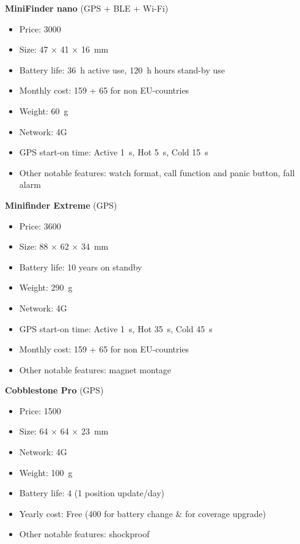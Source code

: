\textbf{MiniFinder nano} (\ac{GPS} + \ac{BLE} + Wi-Fi)
\begin{itemize}[label={}, noitemsep, leftmargin=0pt]
    \item Price: \SI{3000}{\dkk}
    \item Size: \si{47} × \si{41} × \SI{16}{\milli\meter}
    \item Battery life: \SI{36}{\hour} active use, \SI{120}{\hour} hours stand-by use
    \item Monthly cost: \SI{159}{\dkk} + \SI{65}{\dkk} for non EU-countries
    \item Weight: \SI{60}{\gram}
    \item Network: 4G
    \item \ac{GPS} start-on time: Active \SI{1}{\second}, Hot \SI{5}{\second}, Cold \SI{15}{\second}
    \item Other notable features: watch format, call function and panic button, fall alarm
\end{itemize}

\textbf{Minifinder Extreme} (\ac{GPS})
\begin{itemize}[label={}, noitemsep, leftmargin=0pt]
    \item Price: \SI{3600}{\dkk}
    \item Size: \si{88} × \si{62} × \SI{34}{\milli\meter}
    \item Battery life: 10 years on standby
    \item Weight: \SI{290}{\gram}
    \item Network: 4G
    \item \ac{GPS} start-on time: Active \SI{1}{\second}, Hot \SI{35}{\second}, Cold \SI{45}{\second}
    \item Monthly cost: \SI{159}{\dkk} + \SI{65}{\dkk} for non EU-countries
    \item Other notable features: magnet montage
\end{itemize}

\textbf{Cobblestone Pro} (\ac{GPS})
\begin{itemize}[label={}, noitemsep, leftmargin=0pt]
    \item Price: \SI{1500}{\dkk}
    \item Size: \si{64} × \si{64} × \SI{23}{\milli\meter}
    \item Network: 4G
    \item Weight: \SI{100}{\gram}
    \item Battery life: \SI{4}{\year} (1 position update/day)
    \item Yearly cost: Free (\SI{400}{\dkk} for battery change \& for coverage upgrade)
    \item Other notable features: shockproof
\end{itemize}

